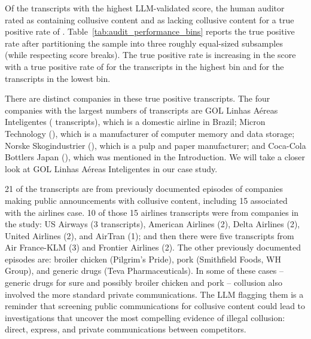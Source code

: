 Of the  transcripts with the highest
LLM-validated score, the human auditor rated
 as containing collusive content and
 as lacking collusive content for a
true positive rate of .
Table~\ref{tab:audit_performance_bins} reports the true positive rate after partitioning the
sample into three roughly equal-sized subsamples (while respecting score
breaks). The true positive rate is increasing in the score with a true
positive rate of  for
the  transcripts in the highest bin and
 for the
 transcripts in the lowest bin. 



There are  distinct companies in these 
true positive transcripts. The four companies with the largest numbers of
transcripts are GOL Linhas A\'{e}reas Inteligentes ( transcripts), which is a
domestic airline in Brazil; Micron Technology (), which is a manufacturer
of computer memory and data storage; Norske Skogindustrier (), which is a
pulp and paper manufacturer; and Coca-Cola Bottlers Japan (), which was 
mentioned in the Introduction. We will take
a closer look at GOL Linhas A\'{e}reas Inteligentes in our case study.

21 of the  transcripts are from
previously documented episodes of companies making public announcements with
collusive content, including 15 associated with the airlines case. 10 of
those 15 airlines transcripts were from companies in the
\textcite{aryal2022coordinated} study: US Airways (3 transcripts), American
Airlines (2), Delta Airlines (2), United Airlines (2), and AirTran (1); and
then there were five transcripts from Air France-KLM (3) and Frontier
Airlines (2). The other previously documented episodes are: broiler
chicken (Pilgrim's Pride), pork (Smithfield Foods, WH Group), and generic
drugs (Teva Pharmaceuticals). In some of these cases -- generic drugs for
sure and possibly broiler chicken and pork -- collusion also involved the
more standard private communications. The LLM flagging them is a reminder
that screening public communications for collusive content could lead to
investigations that uncover the most compelling evidence of illegal
collusion: direct, express, and private communications between competitors.


